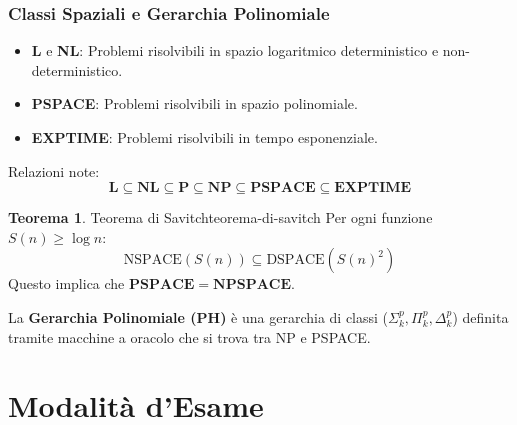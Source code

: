 \documentclass[a4paper]{article}
\theoremstyle{definition} %
\newtheorem{theorem}{Teorema}
\begin{document}
\subsubsection{Classi Spaziali e Gerarchia Polinomiale}
\begin{itemize}
    \item \textbf{L} e \textbf{NL}: Problemi risolvibili in spazio logaritmico deterministico e non-deterministico.
    \item \textbf{PSPACE}: Problemi risolvibili in spazio polinomiale.
    \item \textbf{EXPTIME}: Problemi risolvibili in tempo esponenziale.
\end{itemize}
Relazioni note:
$$ \mathbf{L} \subseteq \mathbf{NL} \subseteq \mathbf{P} \subseteq \mathbf{NP} \subseteq \mathbf{PSPACE} \subseteq \mathbf{EXPTIME} $$
\begin{theorem}{Teorema di Savitch}{teorema-di-savitch}
Per ogni funzione $S(n) \ge \log n$:
$$ \text{NSPACE}(S(n)) \subseteq \text{DSPACE}(S(n)^2) $$
Questo implica che $\mathbf{PSPACE} = \mathbf{NPSPACE}$.
\end{theorem}
La \textbf{Gerarchia Polinomiale (PH)} è una gerarchia di classi ($\Sigma_k^p, \Pi_k^p, \Delta_k^p$) definita tramite macchine a oracolo che si trova tra NP e PSPACE.

\section{Modalità d'Esame}
\end{document}

